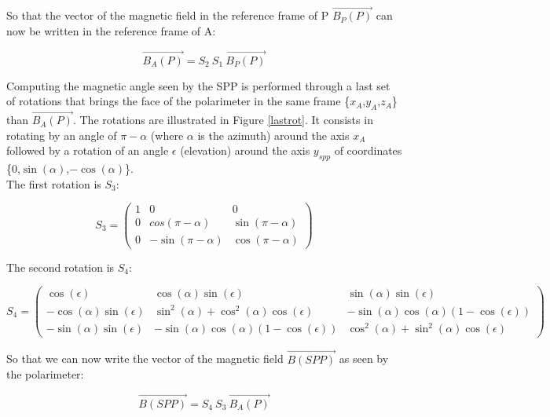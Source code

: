 \documentclass[draft,jgrga]{agutexSI}
\begin{document}
\begin{article}
So that the vector of the magnetic field in the reference frame of P $\overrightarrow{B_P(P)}$ can now be written in the reference frame of A:

\begin{equation}
\overrightarrow{B_A(P)}=S_2\ S_1\ \overrightarrow{B_P(P)}
\label{B_A}
\end{equation}

Computing the magnetic angle seen by the SPP is performed through a last set of rotations that brings the face of the polarimeter in the same frame \{$x_A$,$y_A$,$z_A$\} than $\overrightarrow{B_A(P)}$. The rotations are illustrated in Figure \ref{lastrot}. It consists in rotating by an angle of $\pi-\alpha$ (where $\alpha$ is the azimuth) around the axis $x_A$ followed by a rotation of an angle $\epsilon$ (elevation) around the axis $y_{spp}$ of coordinates \{$0$,$\sin(\alpha)$,$-\cos(\alpha)$\}.\\
The first rotation is $S_3$:

\begin{equation}
S_3=
\begin{pmatrix}
1 & 0 & 0 \\
0 &cos(\pi-\alpha) & \sin(\pi-\alpha) \\
0 &-\sin(\pi-\alpha) & \cos(\pi-\alpha) 
\end{pmatrix}
\end{equation}

The second rotation is $S_4$:
   
   \begin{equation}
S_4=
\begin{pmatrix}
\cos(\epsilon)&\cos(\alpha)\sin(\epsilon)&\sin(\alpha)\sin(\epsilon)\\
-\cos(\alpha)\sin(\epsilon)&\sin^2(\alpha) + \cos^2(\alpha)\cos(\epsilon)&-\sin(\alpha)\cos(\alpha)(1- \cos(\epsilon))\\
-\sin(\alpha)\sin(\epsilon)&-\sin(\alpha)\cos(\alpha)(1- \cos(\epsilon))&\cos^2(\alpha) + \sin^2(\alpha)\cos(\epsilon)
\end{pmatrix}
\end{equation}

So that we can now write the vector of the magnetic field  $\overrightarrow{B(SPP)}$ as seen by the polarimeter:

\begin{equation}
\overrightarrow{B(SPP)}=S_4\ S_3\ \overrightarrow{B_A(P)}
\end{equation}


\end{article}
\end{document}
